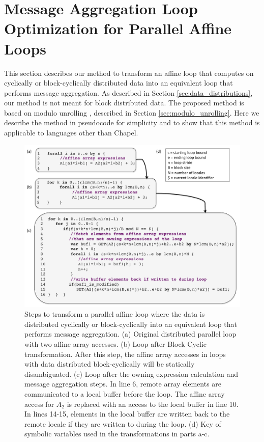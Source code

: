 \section{Message Aggregation Loop Optimization for Parallel Affine Loops}\label{sec:transformation} 

This section describes our method to transform an affine loop that computes on cyclically or block-cyclically distributed data into an equivalent loop that performs message aggregation. As described in Section \ref{sec:data_distributions}, our method is not meant for block distributed data. The proposed method is based on modulo unrolling \cite{barua1999maps}, described in Section \ref{sec:modulo_unrolling}. Here we describe the method in pseudocode for simplicity and to show that this method is applicable to languages other than Chapel. 

\begin{figure}
\begin{center}
\includegraphics[scale=0.35]{./Figures/transformations}
\caption{Steps to transform a parallel affine loop where the data is distributed cyclically or block-cyclically into an equivalent loop that performs message aggregation. (a) Original distributed parallel loop with two affine array accesses. (b) Loop after Block Cyclic transformation. After this step, the affine array accesses in loops with data distributed block-cyclically will be statically disambiguated. (c) Loop after the owning expression calculation and message aggregation steps. In line 6, remote array elements are communicated to a local buffer before the loop. The affine array access for $A_{2}$ is replaced with an access to the local buffer in line 10. In lines 14-15, elements in the local buffer are written back to the remote locale if they are written to during the loop. (d) Key of symbolic variables used in the transformations in parts a-c. }
\label{transformations}
\end{center}
\end{figure}

